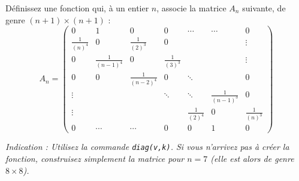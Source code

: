 \begin{exercice}\label{exoMatlab0027}

\newcommand{\frtr}[1]{\frac{1}{(#1)^3}}
\newcommand{\frqu}[1]{\frac{1}{(#1)^4}}

Définissez une fonction qui, à un entier $n$, associe la matrice $A_n$ suivante, de genre $(n+1)\times (n+1)$ :
\[ A_n = \begin{pmatrix}
0 & 1 & 0 & 0 & \cdots & \cdots & 0 \\
\frqu{n} & 0 & \frtr{2} & 0 & & & \vdots \\
0 & \frqu{n-1} & 0 & \frtr{3} & & & \vdots \\
0 & 0 & \frqu{n-2} & 0 & \ddots & & 0 \\
\vdots & & & \ddots & \ddots & \frtr{n-1} & 0 \\
\vdots & & & & \frqu{2} & 0 & \frtr{n} \\
0 & \cdots & \cdots & 0 & 0 & 1 & 0 
\end{pmatrix} \]

\emph{Indication : Utilisez la commande \texttt{diag(v,k)}. Si vous n'arrivez pas à créer la fonction, construisez simplement la matrice pour $n=7$ (elle est alors de genre $8\times 8$).}

\end{exercice}
